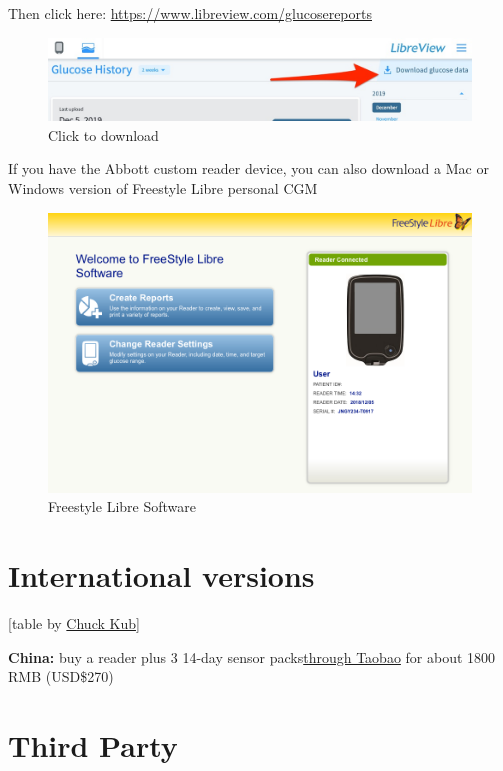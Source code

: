 \documentclass[
]{book}
\begin{document}
Then click here: \url{https://www.libreview.com/glucosereports}

\begin{figure}
\centering
\includegraphics{images/freestyle-download-click.jpg}
\caption{Click to download}
\end{figure}

If you have the Abbott custom reader device, you can also download a Mac or Windows version of Freestyle Libre personal CGM

\begin{figure}
\centering
\includegraphics{images/freestyle-software.png}
\caption{Freestyle Libre Software}
\end{figure}

\hypertarget{international-versions}{%
\section{International versions}\label{international-versions}}

{[}table by \href{https://www.facebook.com/photo.php?fbid=1835069433269419\&set=gm.751003141928341\&type=3\&theater\&ifg=1}{Chuck Kub}{]}

\textbf{China:} buy a reader plus 3 14-day sensor packs\href{https://item.jd.com/32498232197.html}{through Taobao} for about 1800 RMB (USD\$270)

\hypertarget{third-party}{%
\section{Third Party}\label{third-party}}
\end{document}
